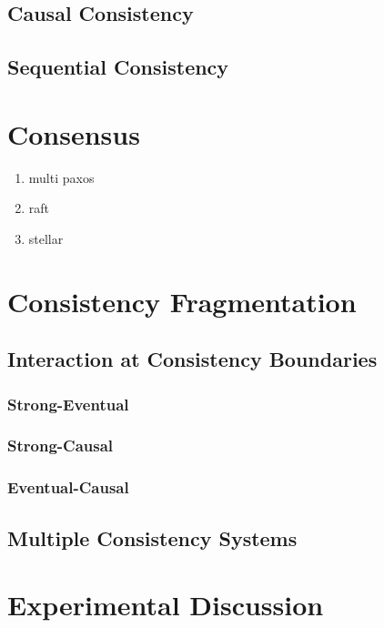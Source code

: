 \documentclass[letterpaper,twocolumn,10pt]{article}
\begin{document}
\subsection{Causal Consistency}

\subsection{Sequential Consistency}

\section{Consensus}

\begin{enumerate}
    \item multi paxos
    \item raft
    \item stellar
\end{enumerate}

\section{Consistency Fragmentation}

\subsection{Interaction at Consistency Boundaries}

\subsubsection{Strong-Eventual}

\subsubsection{Strong-Causal}

\subsubsection{Eventual-Causal}

\subsection{Multiple Consistency Systems}

\section{Experimental Discussion}
\end{document}
